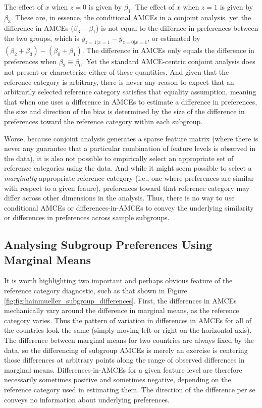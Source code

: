 \documentclass[a4paper,12pt]{article}\usepackage[]{graphicx}\usepackage[]{color}
\begin{document}
\noindent The effect of $x$ when $z=0$ is given by $\beta_1$. The effect of $x$ when $z=1$ is given by $\beta_3$. These are, in essence, the conditional AMCEs in a conjoint analysis. yet the difference in AMCEs ($\beta_3 - \beta_1$) is not equal to the differnce in preferences between the two groups, which is $\bar{y}_{z=1|x=1} - \bar{y}_{z=0|x=1}$, or estimated by $(\beta_2 + \beta_3) - (\beta_0 + \beta_1)$. The difference in AMCEs only equals the difference in preferences when $\beta_2 \equiv \beta_0$. Yet the standard AMCE-centric conjoint analysis does not present or characterize either of these quantities. And given that the reference category is arbitrary, there is never any reason to expect that an arbitrarily selected reference category satisfies that equality assumption, meaning that when one uses a difference in AMCEs to estimate a difference in preferences, the size and direction of the bias is determined by the size of the difference in preferences toward the reference category within each subgroup.

Worse, because conjoint analysis generates a sparse feature matrix (where there is never any guarantee that a particular combination of feature levels is observed in the data), it is also not possible to empirically select an appropriate set of reference categories using the data. And while it might seem possible to select a \textit{marginally} appropriate reference category (i.e., one where preferences are similar with respect to a given feaure), preferences toward that reference category may differ across other dimensions in the analysis. Thus, there is no way to use conditional AMCEs or differences-in-AMCEs to convey the underlying similarity or differences in preferences across sample subgroups.

\subsection{Analysing Subgroup Preferences Using Marginal Means}\label{sec:marginalmeans}

It is worth highlighting two important and perhaps obvious feature of the reference category diagnostic, such as that shown in Figure \ref{fig:fig:hainmueller_subgroup_differences}. First, the differences in AMCEs mechanically vary around the difference in marginal means, as the reference category varies. Thus the pattern of variation in differences in AMCEs for all of the countries look the same (simply moving left or right on the horizontal axis). The difference between marginal means for two countries are always fixed by the data, so the differencing of subgroup AMCEs is merely an exercise is centering those differences at arbitrary points along the range of observed differences in marginal means. Differences-in-AMCEs for a given feature level are therefore necessarily sometimes positive and sometimes negative, depending on the reference category used in estimating them. The direction of the difference per se conveys no information about underlying preferences.
\end{document}
